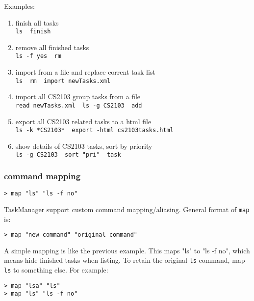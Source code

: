 \documentclass[12pt, a4paper]{article}
\begin{document}
Examples:

\begin{enumerate}
\item finish all tasks\\
  \texttt{ls \textbar \  finish}

\item remove all finished tasks\\
  \texttt{ls -f yes \textbar \  rm}

\item import from a file and replace corrent task list\\
  \texttt{ls \textbar \  rm \textbar \  import newTasks.xml}

\item import all CS2103 group tasks from a file\\
  \texttt{read newTasks.xml \textbar \  ls -g CS2103 \textbar \  add}

\item export all CS2103 related tasks to a html file\\
  \texttt{ls -k *CS2103* \textbar \  export -html cs2103tasks.html}

\item show details of CS2103 tasks, sort by priority\\
  \texttt{ls -g CS2103 \textbar \  sort "pri" \textbar \  task}
\end{enumerate}

\subsubsection{command mapping}

\noindent \texttt{\textgreater \ map "ls" "ls -f no"}

TaskManager support custom command mapping/aliasing. General format of \texttt{map} is:

\noindent \texttt{\textgreater \ map "new command" "original command"}

A simple mapping is like the previous example. This maps "ls" to "ls -f no", which means hide finished tasks when listing.
To retain the original \texttt{ls} command, map \texttt{ls} to something else. For example:

\noindent \texttt{\textgreater \ map "lsa" "ls"\\
  \textgreater \ map "ls" "ls -f no" \footnotemark}

\end{document}

